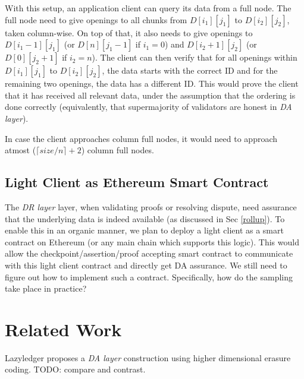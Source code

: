 \documentclass[sigconf, screen=true, nonacm]{acmart}
\newcommand{\DA}{\textit{DA layer}}
\newcommand{\DR}{\textit{DR layer}}
\begin{document}
        With this setup, an application client can query its data from a full node. The full node need to give openings to all chunks from $D[i_1][j_1]$ to $D[i_2][j_2]$, taken column-wise. On top of that, it also needs to give openings to $D[i_1-1][j_1]$ (or $D[n][j_1-1]$ if $i_1=0$) and $D[i_2+1][j_2]$ (or $D[0][j_2+1]$ if $i_2=n$). The client can then verify that for all openings within $D[i_1][j_1]$ to $D[i_2][j_2]$, the data starts with the correct ID and for the remaining two openings, the data has a different ID. This would prove the client that it has received all relevant data, under the assumption that the ordering is done correctly (equivalently, that supermajority of validators are honest in \DA). 

        In case the client approaches column full nodes, it would need to approach atmost ($\lceil size/n \rceil + 2$) column full nodes. 
    
    \subsection{Light Client as Ethereum Smart Contract}
        The \DR{} layer, when validating proofs or resolving dispute, need assurance that the underlying data is indeed available (as discussed in Sec \ref{rollup}). To enable this in an organic manner, we plan to deploy a light client as a smart contract on Ethereum (or any main chain which supports this logic). This would allow the checkpoint/assertion/proof accepting smart contract to communicate with this light client contract and directly get DA assurance. We still need to figure out how to implement such a contract. Specifically, how do the sampling take place in practice?

\section{Related Work}
    Lazyledger \cite{lazyledger} proposes a \DA{} construction using higher dimensional erasure coding. TODO: compare and contrast. 
\end{document}
